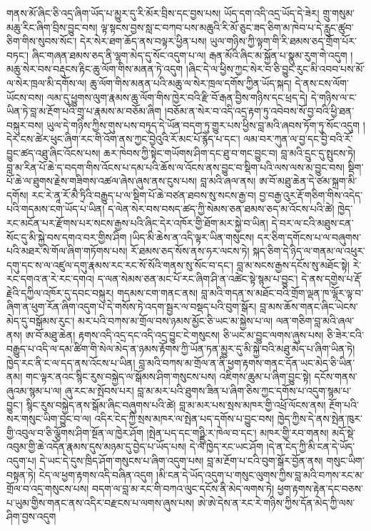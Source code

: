 \documentclass{article}
\begin{document}
གནས་མོ་ཞིང་ཅི་འདྲ་ཞིག་ཡོད་པ་མྱུར་དུ་རི་མོར་བྲིས་དང་བྱས་པས། ཡོད་དག་འདི་འདྲ་ཡོད་དེ་ཟེར། གྲུ་གསུམ་མཆུ་རིང་ཞིག་བྲིས་བྱུང་བས། ལྟ་སྟངས་བྱས་སླ་ང་བཀབ་པས་མཆུའི་རི་མོ་ཅུང་ཟད་ཅིག་མ་ཁེབ་པ་དེ་རླུང་ཚུབ་ཅིག་གིས་སུབས་སོང་། དེར་སེར་ཐག་ཆོད་ནས་བལྟར་ཕྱིན་པས། ཡུལ་གཉིས་ཀྱི་ལྟག་གི་རི་ཐམས་ཅད་གྲོག་པོར་བཏང་། ཞིང་གཞན་ཐམས་ཅད་ནི་ལྷག་མེད་དུ་སོང་འདུག་པ་ལ། རྒན་མོའི་ཞིང་མ་སྐྱོན་པ་སྣུམ་རུག་གེ་འདུག །མཆུ་སེར་བས་བརྡུངས་རྟིང་ཆུ་ལོག་གིས་མནན་ཏེ་འདུག །ཞིང་དེ་ལ་ཕྱིས་ཀྱང་སེར་བ་ཅི་བྱུང་རུང་མི་འབབ་པས་མོ་ལ་སེར་ཁྲལ་མི་དགོས་ལ། ཆུ་ལོག་གིས་མནན་པའི་མཆུ་ལ་སེར་ཁྲལ་དགོས་ཀྱིན་ཡོད་སྐད། དེ་ནས་ངས་ལོག་ཡོངས་བས། ལམ་དུ་ཕྱུགས་ལུག་རྣམས་ཆུ་ལོག་གིས་ཁྱེར་བའི་རྫི་བོ་རྒན་བྱིས་གཉིས་དང་ཕྲད་དེ། དེ་གཉིས་ལ་ང་ཡིན་ཏེ་བླ་མ་རྔོག་པའི་གྲྭ་པ་རྣམས་མ་བཅོམ་ཞིག །བཅོམ་ན་སེར་བ་འདི་འདྲ་རྟག་ཏུ་འབེབས་སོ་བྱ་བའི་ཕྱི་ཐན་བསྐུར་བས། ཡུལ་དེ་གཉིས་ཀྱིས་གུས་པས་བཏུད་དེ་ཡོན་བདག་ཏུ་གྱུར་པས་ཕྱིས་བླ་མའི་ཞབས་ཏོག་ཏུ་སོང་འདུག །དེར་ངས་ཚེར་ཕུང་ཞིག་རང་གི་འོག་ནས་ཀྱང་བྱེའུའི་རོ་མང་པོ་རྙེད་པ་དང་། ལམ་བར་ཀུན་ལ་བྱ་དང་བྱི་བའི་རོ་བྱུང་ཚད་འཐུ་ཞིང་འོངས་པས། ཆར་ཁེབས་ཀྱི་སྟེང་གཡོགས་ཤིག་དང་ཐུ་བ་གང་བྱུང་བ། བླ་མའི་དྲུང་དུ་སྤུངས་ཏེ། བླ་མ་རིན་པོ་ཆེ་ད་བདག་གིས་འོངས་པ་དམ་པའི་ཆོས་ལ་འོངས་ནས་བྱུང་བ་སྡིག་པའི་ལས་ལས་མ་བྱུང་བས། སྡིག་པོ་ཆེ་ལ་ཐུགས་རྗེས་གཟིགས་འཚལ་ཞེས་ཞུས་ནས་ངུས་པས། བླ་མའི་ཞལ་ནས། ཨ་བོ་མཐུ་ཆེན་དེ་ཙམ་སྐྲག་མི་དགོས། རང་རེ་ནཱ་རོ་མཻ་ཏྲིའི་བརྒྱུད་པ་ལ་སྡིག་པོ་ཆེ་བཙན་ཐབས་སུ་སངས་རྒྱ་བ། བྱ་བརྒྱ་འུར་རྡོ་གཅིག་གིས་འདེད་པའི་གདམས་ངག་ཡོད་པ་ཡིན། ད་ལེན་སེར་བས་བསད་ཚད་ཀྱི་སེམས་ཅན་ཐམས་ཅད་མ་འོངས་པའི་ཚེ། ཁྱེད་རང་མངོན་པར་རྫོགས་པར་སངས་རྒྱས་པའི་ཞིང་དེར་འཁོར་གྱི་ཐོག་མར་སྐྱེ་བ་ཡིན། དེ་བར་ལ་ངའི་མཐུས་ངན་སོང་དུ་མི་སྐྱེ་བས་དགའ་བར་གྱིས་ཤིག །ཡིད་མི་ཆེས་ན་འདི་ལྟར་ཡིན་གསུངས། དར་ཅིག་དགོངས་པ་ལ་བཞུགས་པའི་མཐར་སེ་གོལ་ཞིག་གཏོགས་པས། རོ་ཐམས་ཅད་སོས་ནས་ཧར་ལངས་ཏེ། སྐད་ཅིག་དེ་ཉིད་ལ་གནམ་ལ་འཕུར་དགུ་དང་ས་ལ་འཛུལ་དགུ་རྣམས་རང་རང་སོ་སོའི་གནས་སུ་སོང་བ་དང་། བླ་མ་སངས་རྒྱས་དངོས་སུ་མཐོང་སྟེ། རེ་རང་དགའ་ན་རེ་རང་དགའ། ད་ལན་སེམས་ཅན་མང་པོ་རང་ཞིག་ཤི་ན་འཚེང་སྟེ་སྙམ་པ་བྱུང་། དེ་ནས་དགྱེས་པ་རྡོ་རྗེའི་དཀྱིལ་འཁོར་དུ་དབང་བསྐུར། གདམས་ངག་གནང་ནས། བླ་མའི་གདན་ས་མཐོང་བའི་གྲོག་ལྡན་ཁ་ལྷོར་ལྟ་བ་ཞིག་ན་ཕུག་རོན་ཞིག་འདུག་པ་དེ་གསོས་ཏེ་འདག་སྦྱར་ལ་བསྡད་པའི་བུག་སྒོར། བླ་མས་ཆོས་གནང་ཞིང་ཡེངས་མེད་དུ་བསྒོམས་རུང་། མར་པའི་བཀས་མ་གྲོལ་བས་ཉམས་མྱོང་ཅི་ཡང་མ་སྐྱེས་པ་ལ། ལན་གཅིག་བླ་མའི་ཞལ་ནས། ཨ་བོ་མཐུ་ཆེན། རྟགས་འདི་འདྲ་དང་འདི་འདྲ་བྱུང་ངེ་གསུངས། ཅི་ཡང་མ་བྱུང་ལགས་ཞུས་པས། ཅི་ཟེར་ངའི་བརྒྱུད་པ་འདི་ལ་དམ་ཚིག་གི་སེལ་མེད་ན་ཉམས་རྟོགས་ཀྱི་ཡོན་ཏན་མྱུར་དུ་མི་སྐྱེ་བའི་མཐུ་མེད་པ་ཞིག་ཡིན་ཏེ། ཁྱེད་རང་ནི་ང་ལ་དད་ནས་འོངས་པ་ཡིན། བླ་མའི་བཀས་མ་གྲོལ་ན་ནི་ཕྱག་རྟགས་གནང་དོན་ཡང་མེད་ཅི་ཡིན་ནམ། གང་ལྟར་ནའང་སྙིང་རུས་བསྐྱེད་ལ་སྒོམས་ཤིག་གསུངས་པས། འཇིགས་ཆུམ་པ་ཞིག་བྱུང་སྟེ། དངོས་གནས་ཞུའམ་སྙམ་པ་ལ། ཞུ་རང་མ་སྤོབས་པར། བླ་མ་མར་པའི་ཐུགས་ཟིན་པ་ཞིག་ཅིས་ཀྱང་དགོས་པ་འདུག་སྙམ་པ་བྱུང་། སྙིང་རུས་བསྐྱེད་ནས་སྒོམ་ཞིང་བཞུགས་པའི་ཚེ། བླ་མ་མར་པས་སྲས་མཁར་གྱི་འཕྲོ་ལོངས་ནས། རྔོག་པའི་སར་གསུང་ཡིག་བྱུང་བ་ལ། འདིར་ངེད་ཀྱི་སྲས་མཁར་ལ་སྤེན་པད་དགོས་པ་བྱུང་བས། ཁྱེད་ཀྱིས་དེ་ནས་སྤེན་ཁུར་གྱི་འབུལ་བ་ཅི་ལྕོགས་ཤིག་སྔོན་ལ་ཁྱེར་ཤོག །སྤེན་པད་དང་གཉྫྱི་ར་ཁེལ་བ་དང་། མཁར་གྱི་རབ་གནས། མདོ་སྡེ་འབུམ་གྱི་ཆེ་འདོན་རྣམས་དུས་མཉམ་དུ་བྱེད་པ་ཡོད་པས། དེ་ལ་ཁྱེད་རང་ཡང་ཤོག །དེ་ན་ངེད་ཀྱི་མི་ངན་དེ་ཡོད་འདུག་པ། དེ་ཡང་དེ་དུས་ཁྲིད་ཤོག་གསུངས་པ་ཞིག་འདུག་པས། བླ་མ་རྔོག་པ་ངའི་བུག་སྒོར་བྱོན་ནས། གསུང་ཡིག་བསྟན་ཏེ། ངེད་ལ་ཕྱག་རྟགས་འདི་བཞིན་འདུག །མི་ངན་དེ་ཡོད་འདུག་པ་གསུང་ལུགས་ཀྱིས་བླ་མའི་བཀས་རང་མ་གྲོལ་བ་འདྲ་གསུངས་པས། བདག་ལ་བླ་མ་རང་གི་བཀའ་ལུང་དངོས་ནི་མེད་ལགས་ཏེ། ཕྱག་རྟགས་རྟེན་དང་བཅས་པ་ཡུམ་གྱིས་གནང་ནས་འདིར་བརྫངས་པ་ལགས་ཞུས་པས། ཨེ་ཨེ་དེས་ན་རང་རེ་གཉིས་ཀྱིས་དོན་མེད་ཀྱི་ལས་ཤིག་བྱས་འདུག 
\end{document}
